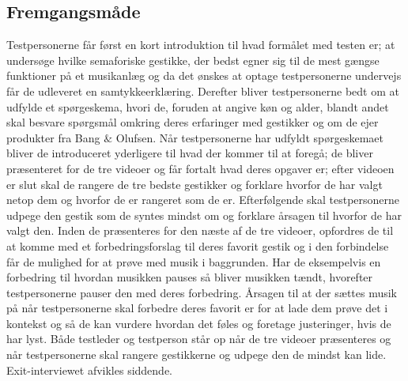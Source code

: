 \subsection{Fremgangsmåde}
\label{FremgangsmaadeValgAfGestikker}
%
Testpersonerne får først en kort introduktion til hvad formålet med testen er; at undersøge hvilke semaforiske gestikke, der bedst egner sig til de mest gængse funktioner på et musikanlæg og da det ønskes at optage testpersonerne undervejs får de udleveret en samtykkeerklæring. Derefter bliver testpersonerne bedt om at udfylde et spørgeskema, hvori de, foruden at angive køn og alder, blandt andet skal besvare spørgsmål omkring deres erfaringer med gestikker og om de ejer produkter fra Bang $\&$ Olufsen. Når testpersonerne har udfyldt spørgeskemaet bliver de introduceret yderligere til hvad der kommer til at foregå; de bliver præsenteret for de tre videoer og får fortalt hvad deres opgaver er; efter videoen er slut skal de rangere de tre bedste gestikker og forklare hvorfor de har valgt netop dem og hvorfor de er rangeret som de er. Efterfølgende skal testpersonerne udpege den gestik som de syntes mindst om og forklare årsagen til hvorfor de har valgt den. Inden de præsenteres for den næste af de tre videoer, opfordres de til at komme med et forbedringsforslag til deres favorit gestik og i den forbindelse får de mulighed for at prøve med musik i baggrunden. Har de eksempelvis en forbedring til hvordan musikken pauses så bliver musikken tændt, hvorefter testpersonerne pauser den med deres forbedring. Årsagen til at der sættes musik på når testpersonerne skal forbedre deres favorit er for at lade dem prøve det i kontekst og så de kan vurdere hvordan det føles og foretage justeringer, hvis de har lyst. Både testleder og testperson står op når de tre videoer præsenteres og når testpersonerne skal rangere gestikkerne og udpege den de mindst kan lide. Exit-interviewet afvikles siddende.  

